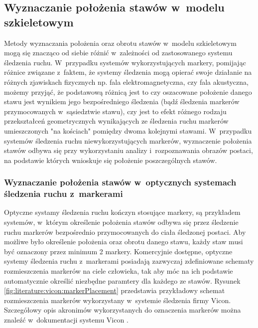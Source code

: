 
		
\subsection{Wyznaczanie położenia stawów w~modelu szkieletowym}
Metody wyznaczania położenia oraz obrotu stawów w~modelu szkieletowym mogą się znacząco od siebie różnić w~zależności od zastosowanego systemu śledzenia ruchu. W~przypadku systemów wykorzystujących markery, pomijając różnice związane z~faktem, że systemy śledzenia mogą opierać swoje działanie na różnych zjawiskach fizycznych np. fala elektromagnetyczna, czy fala akustyczna, możemy przyjąć, że podstawową różnicą jest to czy oszacowane położenie danego stawu jest wynikiem jego bezpośredniego śledzenia (bądź śledzenia markerów przymocowanych w~sąsiedztwie stawu), czy jest to efekt różnego rodzaju przekształceń geometrycznych wynikających ze śledzenia ruchu markerów umieszczonych "na kościach" pomiędzy dwoma kolejnymi stawami. W~przypadku systemów śledzenia ruchu niewykorzystujących markerów, wyznaczenie położenia stawów odbywa się przy wykorzystaniu analizy i~rozpoznawania obrazów postaci, na podstawie których wnioskuje się położenie poszczególnych stawów.
		
\subsubsection*{Wyznaczanie położenia stawów w~optycznych systemach śledzenia ruchu z~markerami}
Optyczne systamy śledzenia ruchu kończyn stosujące markery, są przykładem systemów, w~którym określenie położenia stawów odbywa się przez śledzenie ruchu markerów bezpośrednio przymocowanych do ciała śledzonej postaci. Aby możliwe było określenie położenia oraz obrotu danego stawu, każdy staw musi być oznaczony przez minimum 2 markery. Komercyjnie dostępne, optyczne systemy śledzenia ruchu z~markerami posiadają zazwyczaj zdefiniowane schematy rozmieszczenia markerów na ciele człowieka, tak aby móc na ich podstawie automatycznie określić niezbędne paramtery dla każdego ze stawów. Rysunek \ref{fig:literature:vicon:markerPlacement} przedstawia przykładowy schemat rozmieszczenia markerów wykorzystany w~systemie śledzenia firmy Vicon. Szczegółowy opis akronimów wykorzystanych do oznaczenia markerów można znaleźć w~dokumentacji systemu Vicon \cite{ViconGaitPlacement}.
		
